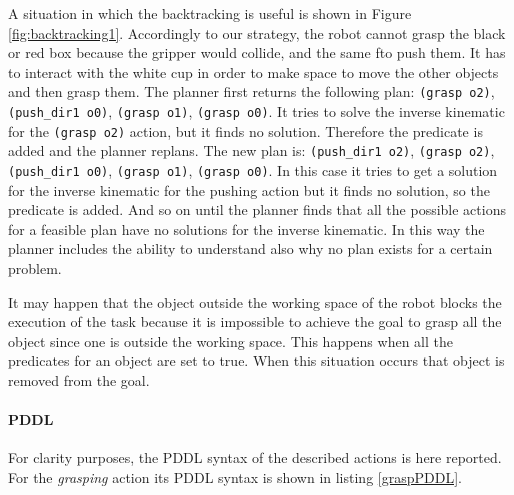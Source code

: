 A situation in which the backtracking is useful is shown in Figure \ref{fig:backtracking1}. Accordingly to our strategy, the robot cannot grasp the black or red box because the gripper would collide, and the same fto push them. It has to interact with the white cup in order to make space to move the other objects and then grasp them. The planner first returns the following plan: \texttt{(grasp o2)}, \texttt{(push\_dir1 o0)}, \texttt{(grasp o1)}, \texttt{(grasp o0)}. It tries to solve the inverse kinematic for the \texttt{(grasp o2)} action, but it finds no solution. Therefore the predicate  is added and the planner replans. The new plan is: \texttt{(push\_dir1 o2)}, \texttt{(grasp o2)}, \texttt{(push\_dir1 o0)}, \texttt{(grasp o1)}, \texttt{(grasp o0)}. In this case it tries to get a solution for the inverse kinematic for the pushing action but it finds no solution, so the predicate  is added. And so on until the planner finds that all the possible actions for a feasible plan have no solutions for the inverse kinematic. In this way the planner includes the ability to understand also why no plan exists for a certain problem. 

It may happen that the object outside the working space of the robot blocks the execution of the task because it is impossible to achieve the goal to grasp all the object since one is outside the working space.
This happens when all the  predicates for an object are set to true. When this situation occurs that object is removed from the goal.

\paragraph{PDDL}
For clarity purposes, the PDDL syntax of the described actions is here reported. 
For the \textit{grasping} action its PDDL syntax is shown in listing \ref{graspPDDL}.

